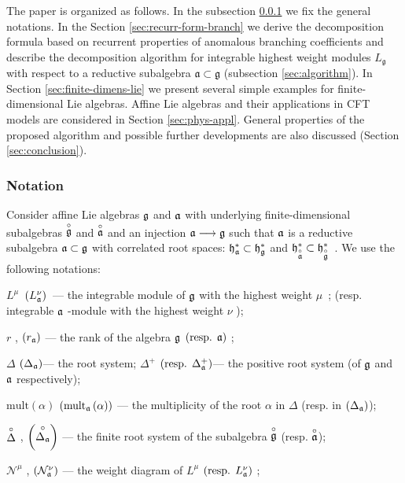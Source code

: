 The paper is organized as follows. In the subsection \ref{sec:notation}  we fix the general notations.
In the Section \ref{sec:recurr-form-branch} we derive the decomposition formula based on
recurrent properties of anomalous branching coefficients and describe the decomposition algorithm
for integrable highest weight modules
$L_{\mathfrak{g}}$ with respect to a reductive subalgebra $\mathfrak{a}\subset \mathfrak{g}$
(subsection \ref{sec:algorithm}). In Section \ref{sec:finite-dimens-lie} we present several
simple examples for finite-dimensional Lie algebras. Affine Lie algebras and their applications in
CFT models are considered in Section \ref{sec:phys-appl}.
General properties of the proposed algorithm and
possible further developments are also discussed (Section \ref{sec:conclusion}).

\subsubsection{Notation}
\label{sec:notation}

Consider affine Lie algebras $\frak{g}$ and $\mathfrak{a}$ with
underlying finite-dimensional subalgebras $\stackrel{\circ }{\mathfrak{g}}$ and $%
\ao$ and an injection $\af\longrightarrow \frak{g%
}$ such that $\mathfrak{a}$ is a reductive subalgebra $\frak{a\subset g}$ with
correlated root spaces: $\frak{h}_{\af}^{\ast }\subset \frak{h}_{\frak{g%
}}^{\ast }$ and $\frak{h}_{\ao}^{\ast }\subset \frak{h%
}_{\go}^{\ast }$\
.
We use the following notations:

$L^{\mu }$\ $\left( L_{\mathfrak{a}}^{\nu }\right) $\ --- the integrable module
of $\frak{g}$ with the highest weight $\mu $\ ; (resp. integrable $\mathfrak{a}$
-module with the highest weight $\nu $ );

$r$ , $\left( r_{\mathfrak{a}}\right) $ --- the rank of the algebra $\frak{g}$ $%
\left( \mbox{resp. }\af\right) $ ;

$\Delta $ $\left( \Delta _{\mathfrak{a}}\right) $--- the root system; $\Delta
^{+} $ $\left( \mbox{resp. }\Delta _{\mathfrak{a}}^{+}\right) $--- the positive
root system (of $\frak{g}$ and $\mathfrak{a}$ respectively);

$\mathrm{mult}\left( \alpha \right) $ $\left( \mathrm{mult}_{\mathfrak{a}}\left(
\alpha \right) \right) $ --- the multiplicity of the root $\alpha$ in $\Delta
$ (resp. in $\left( \Delta _{\mathfrak{a}}\right) $);

$\stackrel{\circ }{\Delta}$ , $\left( \co{\Delta _{\af}}%
\right)$ --- the finite root system of the subalgebra $\co{%
\frak{g}}$ (resp. $\stackrel{\circ }{\mathfrak{a}}$);

$\mathcal{N}^{\mu }$ , $\left( \mathcal{N}_{\mathfrak{a}}^{\nu }\right) $ --- the
weight diagram of $L^{\mu }$ $\left( \mbox{resp. }L_{\mathfrak{a}}^{\nu }\right)
$ ;

